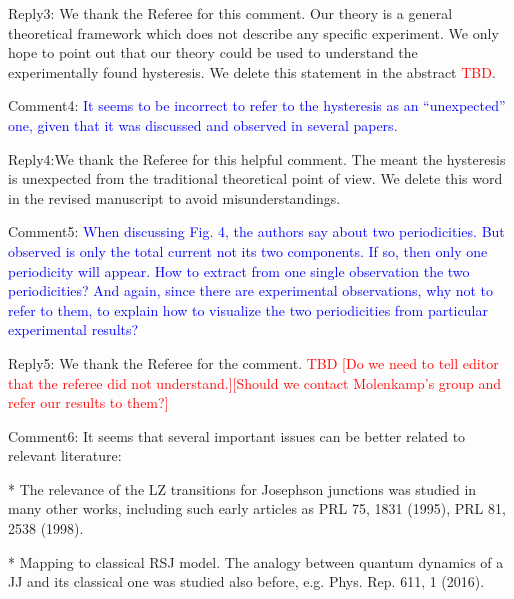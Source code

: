 \documentclass[onecolumn,preprintnumbers,amsmath,amssymb,prb]{revtex4}
\newcommand{\red}[1]{\textcolor{red}{#1}}
\newcommand{\blue}[1]{\textcolor{blue}{#1}}
\begin{document}
\vspace{5mm}

\noindent Reply3: We thank the Referee for this comment. Our theory is a general theoretical framework which does not describe any specific experiment. We only hope to point out that our theory could be used to understand the experimentally found hysteresis. We delete this statement in the abstract \red{TBD}.

\vspace{5mm}

\noindent Comment4: 
\blue{It seems to be incorrect to refer to the hysteresis as an “unexpected”
one, given that it was discussed and observed in several papers.}


\vspace{5mm}

\noindent Reply4:{We thank the Referee for this helpful comment. The meant the hysteresis is unexpected from the traditional theoretical point of view. We delete this word in the revised manuscript to avoid misunderstandings.}

\vspace{5mm}

\noindent Comment5: 
\blue{When discussing Fig. 4, the authors say about two periodicities. But
observed is only the total current not its two components. If so, then
only one periodicity will appear. How to extract from one single
observation the two periodicities? And again, since there are
experimental observations, why not to refer to them, to explain how to
visualize the two periodicities from particular experimental results?}

\vspace{5mm}

\noindent Reply5: We thank the Referee for the comment. \red{TBD [Do we need to tell editor that the referee did not understand.][Should we contact Molenkamp's group and refer our results to them?]}

\vspace{5mm}

\noindent Comment6: 
It seems that several important issues can be better related to
relevant literature:

* The relevance of the LZ transitions for Josephson junctions was
studied in many other works, including such early articles as PRL 75,
1831 (1995), PRL 81, 2538 (1998).

* Mapping to classical RSJ model. The analogy between quantum dynamics
of a JJ and its classical one was studied also before, e.g. Phys. Rep.
611, 1 (2016).
\end{document}
